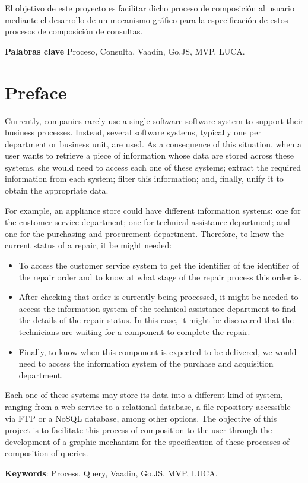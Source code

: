 	
El objetivo de este proyecto es facilitar dicho proceso de composición al usuario mediante el desarrollo de un mecanismo gráfico para la especificación de estos procesos de composición de consultas.

	
 \textbf{Palabras clave}
 Proceso, Consulta, Vaadin, Go.JS, MVP, LUCA.
	
\chapter*{Preface}

Currently, companies rarely use a single software software system to support their business processes. Instead, several software systems, typically one per department or business unit, are used.  As a consequence of this situation, when a user wants to retrieve a piece of information whose data are stored across these
systems, she would need to access each one of these systems; extract the required information from each system; filter this information; and, finally, unify it to obtain the appropriate data.
	
For example, an appliance store could have different information systems: one for the customer service department; one for technical assistance department; and one for the purchasing and procurement department. Therefore, to know the current status of a repair, it be might needed:

\begin{itemize}

    \item To access the customer service system to get the identifier of the identifier of the repair order and to know at what stage of the repair process this order is.
    \item After checking that order is currently being processed, it might be needed to access the information system of the technical assistance department to find the details of the repair status. In this case, it might be discovered that the technicians are waiting for a component to complete the repair.
	\item Finally, to know when this component is expected to be delivered, we would need to access the information system of the purchase and acquisition department.
	\end{itemize}

Each one of these systems may store its data into a different kind of system, ranging from a web service to a relational database, a file repository accessible via FTP or a NoSQL database, among other options. The objective of this project is to facilitate this process of composition to the user through the development of a graphic mechanism for the specification of these processes of composition of queries.
	

	\textbf{Keywords}:
	Process, Query, Vaadin, Go.JS, MVP, LUCA. 